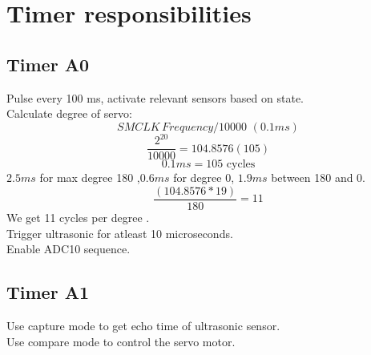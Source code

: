 \documentclass{article}
\begin{document}
\section{Timer responsibilities}
\subsection{Timer A0}
Pulse every 100 ms, activate relevant sensors based on state.\\
Calculate degree of servo:\\
\[SMCLK\, Frequency / 10000\,\,(0.1ms)\]
\[\frac{2^{20}}{10000} = 104.8576(105)\]
\[0.1ms = 105 \text{  cycles}\]
$2.5ms$ for max degree 180 ,$0.6ms$ for degree 0, $1.9ms$ between 180 and 0.
\[\frac{(104.8576 * 19)}{180} = 11\]
We get 11 cycles per degree .\\
Trigger ultrasonic for atleast 10 microseconds.\\
Enable ADC10 sequence.\\

\subsection{Timer A1}
Use capture mode to get echo time of ultrasonic sensor.\\
Use compare mode to control the servo motor.\\
\end{document}
